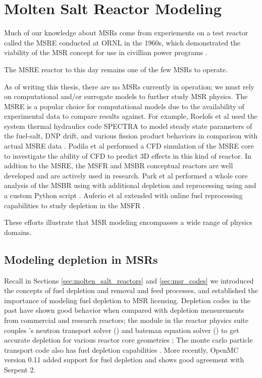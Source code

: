 \chapter{Molten Salt Reactor Modeling}%
Much of our knowledge about \Gls{MSR}s come from experiements on a test reactor
called the \Gls{MSRE} conducted at \Gls{ORNL} in the 1960s, which demonstrated
the viability of the \Gls{MSR} concept for use in civillian power programs
\cite{haubenreich_experience_1970} \cite{rosenthal_molten-salt_1970}.

The \Gls{MSRE} reactor to this day remains one of the few \Gls{MSR}s to operate.

As of writing this thesis, there are no \Gls{MSR}s currently in operation; we
must rely on computational and/or surrogate models to further study \Gls{MSR}
physics. The \Gls{MSRE} is a popular choice for computational models due to the
availability of experimental data to compare results against. For example,
Roelofs et al used the system thermal hydraulics code SPECTRA to model steady
state parameters of the fuel-salt, \Gls{DNP} drift, and various fission product
behaviors in comparison with actual MSRE data \cite{roelofs_molten_2021}.
Podila et al performed a \Gls{CFD} simulation of the \Gls{MSRE} core to
investigate the ability of \Gls{CFD} to predict 3D effects in this kind of
reactor\cite{podila_cfd_2019}. 
In addtion to the \Gls{MSRE}, the \Gls{MSFR}\cite{merle-lucotte_launching_2011}
and \Gls{MSBR}\cite{robertson_conceptual_1971} conceptual reactors are well
developed and are actively used in research. Park et al performed a whole core
analysis of the \Gls{MSBR} using \MCNPSIX with additional depletion and
reprocessing using \CINDERNINETY and a custom Python script \cite{park_whole_2015}.
Auferio et al extended \SerpentTWO with online fuel reprocessing capabilities to
study depletion in the \Gls{MSFR} \cite{auferio_extended_2013}.

These efforts illustrate that \Gls{MSR} modeling encompasses a wide range of
physics domains.

\section{Modeling depletion in \Gls{MSR}s} Recall in Sections
\ref{sec:molten_salt_reactors} and \ref{sec:msr_codes} we introduced the
concepts of fuel depletion and removal and feed processes, and established the
importance of modeling fuel depletion to \Gls{MSR} licensing. Depletion codes in
the past have shown good behavior when compared with depletion measurements from
commercial and research reactors; the \TRITON module in the \SCALE reactor physics
suite couples \SCALE's neutron transport solver (\Shift) and bateman equation
solver (\ORIGEN) to get accurate depletion for various reactor core geometries
\cite{dehart_reactor_2011}; The \SerpentTWO monte carlo particle transport code
also has fuel depletion capabilities \cite{leppanen_burnup_2009}. More recently,
OpenMC version 0.11 added support for fuel depletion and shows good agreement
with Serpent 2\cite{romano_depletion_2021}. 

